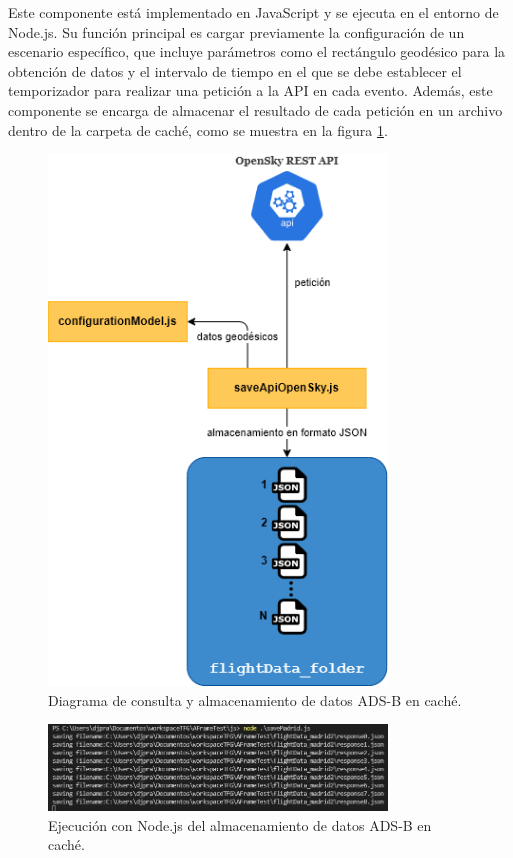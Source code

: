 \documentclass[a4paper, 11pt]{book}
\begin{document}
Este componente está implementado en JavaScript y se ejecuta en el entorno de Node.js. Su función principal es cargar previamente la configuración de un escenario específico, que incluye parámetros como el rectángulo geodésico para la obtención de datos y el intervalo de tiempo en el que se debe establecer el temporizador para realizar una petición a la API en cada evento. Además, este componente se encarga de almacenar el resultado de cada petición en un archivo dentro de la carpeta de caché, como se muestra en la figura \ref{fig:saveApiData}.
\begin{figure}[H]
  \centering
  \includegraphics[width=9cm, keepaspectratio]{img/almacenamientoCache.drawio.png}
  \caption{Diagrama de consulta y almacenamiento de datos ADS-B en caché.}
  \label{fig:saveApiData}
\end{figure}
\begin{figure}[H]
  \centering
  \includegraphics[width=9cm, keepaspectratio]{img/captura_datos_madrid.jpg}
  \caption{Ejecución con Node.js del almacenamiento de datos ADS-B en caché.}
  \label{fig:capturaDatosCache}
\end{figure}
\end{document}
